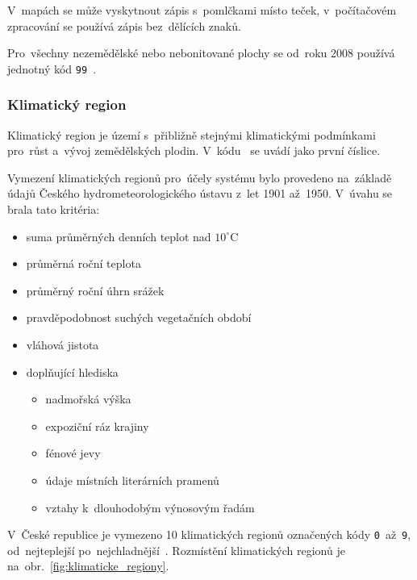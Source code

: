V~mapách se může vyskytnout zápis s~pomlčkami místo teček, v~počítačovém zpracování se používá zápis bez~dělících znaků.

Pro~všechny nezemědělské nebo nebonitované plochy se od~roku 2008 používá jednotný kód \texttt{99}~\citep{metodika_bpej}.

\subsubsection{Klimatický region}
\label{klimaticky_region}

Klimatický region je území s~přibližně stejnými klimatickými podmínkami pro~růst a~vývoj zemědělských plodin. V~kódu~ se uvádí jako první číslice.

Vymezení klimatických regionů pro~účely systému  bylo provedeno na~zá\-kladě údajů Českého hydrometeorologického ústavu z~let 1901 až~1950. V~úvahu se brala tato kritéria:
	\begin{itemize}[leftmargin=1.5cm, noitemsep]
		\item suma průměrných denních teplot nad $10^\circ$C
		\item průměrná roční teplota
		\item průměrný roční úhrn srážek
		\item pravděpodobnost suchých vegetačních období
		\item vláhová jistota
		\item doplňující hlediska
			\begin{itemize}[leftmargin=1cm, noitemsep]
				\item nadmořská výška
				\item expoziční ráz krajiny
				\item fénové jevy
				\item údaje místních literárních pramenů
				\item vztahy k~dlouhodobým výnosovým řadám
			\end{itemize}
	\end{itemize}

V~České republice je vymezeno 10 klimatických regionů označených kódy \texttt{0}~až~\texttt{9}, od~nejteplejší po~nejchladnější~\citep{vyhlaska_327}. Rozmístění klimatických regionů je na~obr.~\ref{fig:klimaticke_regiony}.

